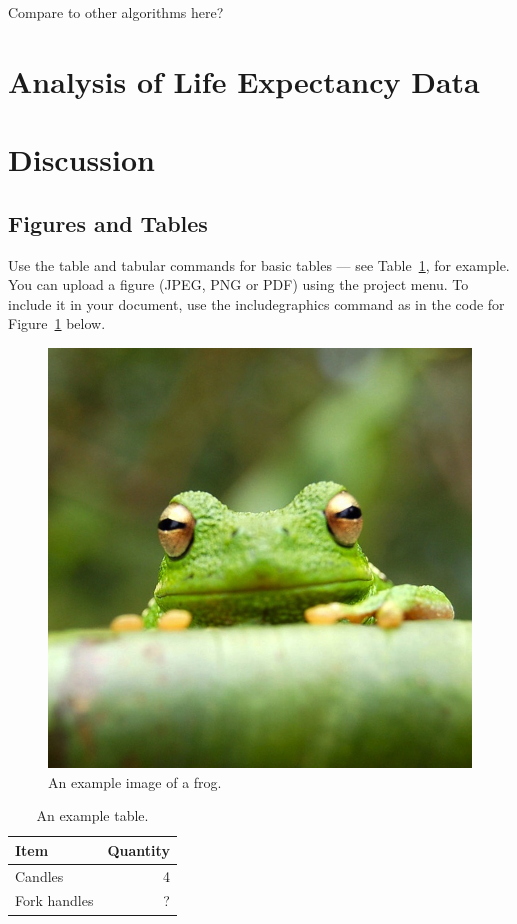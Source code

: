 \documentclass[fleqn,10pt]{olplainarticle}\usepackage[]{graphicx}\usepackage[]{color}
\begin{document}
Compare to other algorithms here?


\section{Analysis of Life Expectancy Data}



\section{Discussion}

\subsection{Figures and Tables}

Use the table and tabular commands for basic tables --- see Table~\ref{tab:widgets}, for example. You can upload a figure (JPEG, PNG or PDF) using the project menu. To include it in your document, use the includegraphics command as in the code for Figure~\ref{fig:view} below.

\begin{figure}[ht]
\centering
\includegraphics[width=0.7\linewidth]{frog}
\caption{An example image of a frog.}
\label{fig:view}
\end{figure}

\begin{table}[ht]
\centering
\begin{tabular}{l|r}
Item & Quantity \\\hline
Candles & 4 \\
Fork handles & ?  
\end{tabular}
\caption{\label{tab:widgets}An example table.}
\end{table}
\end{document}
